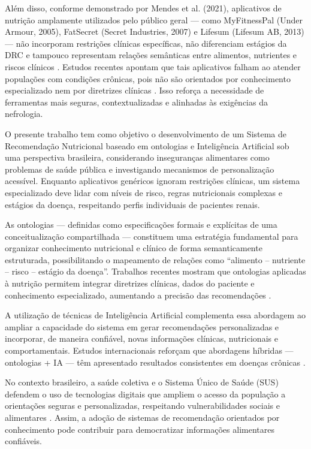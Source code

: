 \documentclass[12pt, a4paper, twocolumn]{article}
\begin{document}
Além disso, conforme demonstrado por Mendes et al. (2021), aplicativos de nutrição amplamente utilizados pelo público geral --- como MyFitnessPal (Under Armour, 2005), FatSecret (Secret Industries, 2007) e Lifesum (Lifesum AB, 2013) --- não incorporam restrições clínicas específicas, não diferenciam estágios da DRC e tampouco representam relações semânticas entre alimentos, nutrientes e riscos clínicos \cite{mendes2021}. Estudos recentes apontam que tais aplicativos falham ao atender populações com condições crônicas, pois não são orientados por conhecimento especializado nem por diretrizes clínicas \cite{mendes2021,chen2019}. Isso reforça a necessidade de ferramentas mais seguras, contextualizadas e alinhadas às exigências da nefrologia.

O presente trabalho tem como objetivo o desenvolvimento de um Sistema de Recomendação Nutricional baseado em ontologias e Inteligência Artificial sob uma perspectiva brasileira, considerando inseguranças alimentares como problemas de saúde pública e investigando mecanismos de personalização acessível. Enquanto aplicativos genéricos ignoram restrições clínicas, um sistema especializado deve lidar com níveis de risco, regras nutricionais complexas e estágios da doença, respeitando perfis individuais de pacientes renais.

As ontologias --- definidas como especificações formais e explícitas de uma conceitualização compartilhada \cite{gruber1993} --- constituem uma estratégia fundamental para organizar conhecimento nutricional e clínico de forma semanticamente estruturada, possibilitando o mapeamento de relações como ``alimento -- nutriente -- risco -- estágio da doença''. Trabalhos recentes mostram que ontologias aplicadas à nutrição permitem integrar diretrizes clínicas, dados do paciente e conhecimento especializado, aumentando a precisão das recomendações \cite{zhang2023,mendes2021,mckensy2022}.

A utilização de técnicas de Inteligência Artificial complementa essa abordagem ao ampliar a capacidade do sistema em gerar recomendações personalizadas e incorporar, de maneira confiável, novas informações clínicas, nutricionais e comportamentais. Estudos internacionais reforçam que abordagens híbridas --- ontologias + IA --- têm apresentado resultados consistentes em doenças crônicas \cite{zhang2023,gogebakan2024}.

No contexto brasileiro, a saúde coletiva e o Sistema Único de Saúde (SUS) defendem o uso de tecnologias digitais que ampliem o acesso da população a orientações seguras e personalizadas, respeitando vulnerabilidades sociais e alimentares \cite{krieger2023}. Assim, a adoção de sistemas de recomendação orientados por conhecimento pode contribuir para democratizar informações alimentares confiáveis.
\end{document}
